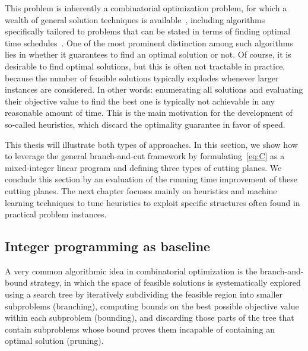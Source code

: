 \documentclass[a4paper]{report}
\theoremstyle{definition}
\theoremstyle{plain}
\begin{document}
This problem is inherently a combinatorial optimization problem, for which a
wealth of general solution techniques is
available~\cite{duIntroductionCombinatorialOptimization2022}, including
algorithms specifically tailored to problems that can be stated in terms of
finding optimal time
schedules~\cite{pinedoSchedulingTheoryAlgorithms2016,grahamOptimizationApproximationDeterministic1979}.
%
One of the most prominent distinction among such algorithms lies in whether it
guarantees to find an optimal solution or not.
%
Of course, it is desirable to find optimal solutions, but this is often not
tractable in practice, because the number of feasible solutions typically
explodes whenever larger instances are considered.
%
In other words: enumerating all solutions and evaluating their objective value
to find the best one is typically not achievable in any reasonable amount of
time.
%
This is the main motivation for the development of so-called heuristics, which
discard the optimality guarantee in favor of speed.

This thesis will illustrate both types of approaches.
%
In this section, we show how to leverage the general branch-and-cut framework by
formulating~\eqref{eq:C} as a mixed-integer linear
program and defining three types of cutting planes.
%
We conclude this section by an evaluation of the running time improvement of
these cutting planes.
%
The next chapter focuses mainly on heuristics and machine learning techniques to
tune heuristics to exploit specific structures often found in practical problem
instances.


\subsection{Integer programming as baseline}\label{sec:branch-and-bound}


A very common algorithmic idea in combinatorial optimization is the
branch-and-bound strategy, in which the space of feasible solutions is
systematically explored using a search tree by iteratively subdividing the
feasible region into smaller subproblems (branching), computing bounds on the
best possible objective value within each subproblem (bounding), and discarding
those parts of the tree that contain subproblems whose bound proves them
incapable of containing an optimal solution (pruning).
\end{document}
